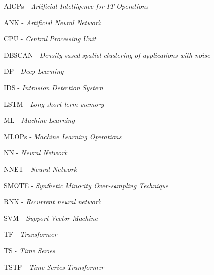 \documentclass[
	12pt,				%
	openright,			%
	oneside,			%
	a4paper,			%
	english,			%
	french,				%
	spanish,			%
	brazil				%
	]{abntex2}
\begin{document}


\frenchspacing %
\imprimircapa
\imprimirfolhaderosto*


\begin{siglas}
\item[AIOPs] - \textit{Artificial Intelligence for IT Operations}
\item[ANN] - \textit{Artificial Neural Network}
\item[CPU] - \textit{Central Processing Unit}
\item[DBSCAN] - \textit{Density-based spatial clustering of applications with noise}
\item[DP] - \textit{Deep Learning}
\item[IDS] - \textit{Intrusion Detection System}
\item[LSTM] - \textit{Long short-term memory}
\item[ML] - \textit{Machine Learning}
\item[MLOPs] - \textit{Machine Learning Operations}
\item[NN] - \textit{Neural Network}
\item[NNET] - \textit{Neural Network}
\item[SMOTE] - \textit{Synthetic Minority Over-sampling Technique}
\item[RNN] - \textit{Recurrent neural network}
\item[SVM] - \textit{Support Vector Machine}
\item[TF] - \textit{Transformer}
\item[TS] - \textit{Time Series}
\item[TSTF] - \textit{Time Series Transformer}
\end{siglas}

\tableofcontents
\cleardoublepage

\pagestyle{simple}

%
%
%
%
%





\end{document}
